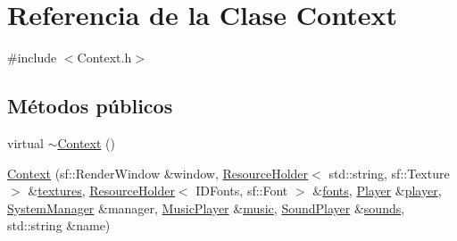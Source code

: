 \hypertarget{classContext}{}\section{Referencia de la Clase Context}
\label{classContext}


{\ttfamily \#include $<$Context.\+h$>$}

\subsection*{Métodos públicos}
\begin{DoxyCompactItemize}
\item 
virtual \hyperlink{classContext_a2d34e4556448e40693f61d15e091b604}{$\sim$\+Context} ()
\item 
\hyperlink{classContext_a6e0630a0d56d8407216decee4add6d3f}{Context} (sf\+::\+Render\+Window \&window, \hyperlink{classResourceHolder}{Resource\+Holder}$<$ std\+::string, sf\+::\+Texture $>$ \&\hyperlink{classContext_a59ac23d12151de1912ab7f6d76e182b8}{textures}, \hyperlink{classResourceHolder}{Resource\+Holder}$<$ I\+D\+Fonts, sf\+::\+Font $>$ \&\hyperlink{classContext_a6e5b6ab3c18fc7f42f205774a597cdc1}{fonts}, \hyperlink{classPlayer}{Player} \&\hyperlink{classContext_a56c6b66908f8cb170e85a5a0e8dc6081}{player}, \hyperlink{classSystemManager}{System\+Manager} \&manager, \hyperlink{classMusicPlayer}{Music\+Player} \&\hyperlink{classContext_aaec563a152c2a98312c9f72a1b0a342a}{music}, \hyperlink{classSoundPlayer}{Sound\+Player} \&\hyperlink{classContext_ad83991aa701d0e22274e61e8bedb186f}{sounds}, std\+::string \&name)
\end{DoxyCompactItemize}
